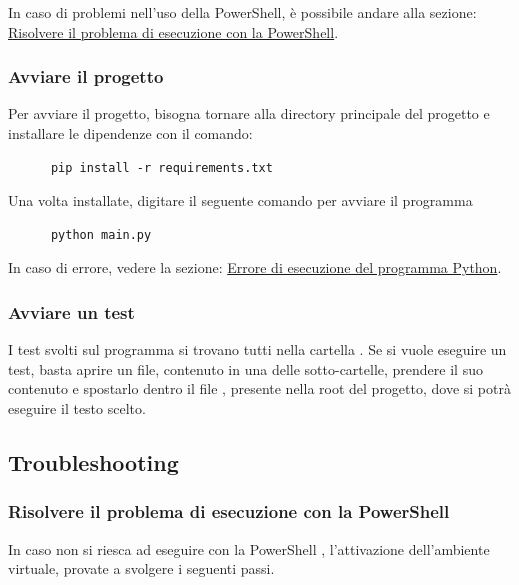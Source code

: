 \documentclass[12pt, letterpaper]{article}
\begin{document}
\begin{appendices}
      \noindent In caso di problemi nell'uso della PowerShell, è possibile andare alla
      sezione: \hyperref[sec:powershell-error]{Risolvere il problema di esecuzione con la PowerShell}. \\

      \subsubsection{Avviare il progetto}

      Per avviare il progetto, bisogna tornare alla directory principale del progetto e installare
      le dipendenze con il comando: \\

      \begin{verbatim}
      pip install -r requirements.txt
\end{verbatim}

      \noindent Una volta installate, digitare il seguente comando per avviare il programma

      \begin{verbatim}
      python main.py
\end{verbatim}

      \noindent In caso di errore, vedere la sezione:
      \hyperref[sec:python-error]{Errore di esecuzione del programma Python}.

      \subsubsection{Avviare un test}

      I test svolti sul programma si trovano tutti nella cartella . Se si vuole eseguire un
      test, basta aprire un file, contenuto in una delle sotto-cartelle, prendere il suo contenuto e spostarlo
      dentro il file , presente nella root del progetto, dove si potrà eseguire il testo scelto.

      \subsection{Troubleshooting}

      \subsubsection{Risolvere il problema di esecuzione con la PowerShell}
      \label{sec:powershell-error}

      In caso non si riesca ad eseguire con la PowerShell \cite{power-shell-resolution},
      l'attivazione dell'ambiente virtuale, provate a svolgere i seguenti passi. \\


\end{appendices}
\end{document}
